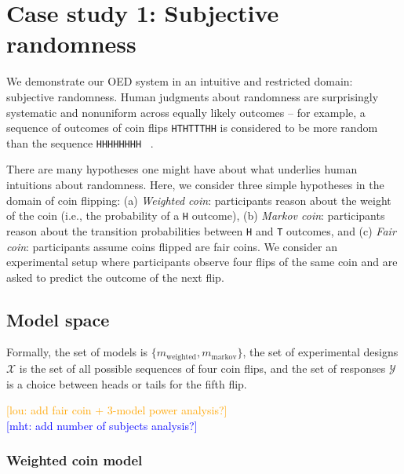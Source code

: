 \documentclass{article}
\newcommand{\mht}[1]{\textcolor{Blue}{[mht: #1]}}
\newcommand{\lou}[1]{\textcolor{orange}{[lou: #1]}}
\begin{document}
\section{Case study 1: Subjective randomness}
\label{s:tutorial}

We demonstrate our OED system in an intuitive and restricted domain: subjective randomness.
Human judgments about randomness are surprisingly systematic and nonuniform across equally likely outcomes -- for example, a sequence of outcomes of coin flips \lstinline{HTHTTTHH} is considered to be more random than the sequence \lstinline{HHHHHHHH} ~\cite{goodfellow38:jep, griffiths01:cogsci}.

There are many hypotheses one might have about what underlies human intuitions about randomness.
Here, we consider three simple hypotheses in the domain of coin flipping: (a) \emph{Weighted coin}: participants reason about the weight of the coin (i.e., the probability of a \lstinline{H} outcome), (b) \emph{Markov coin}: participants reason about the transition probabilities between \lstinline{H} and \lstinline{T} outcomes, and (c) \emph{Fair coin}: participants assume coins flipped are fair coins.
We consider an experimental setup where participants observe four flips of the same coin and are asked to predict the outcome of the next flip.


\subsection{Model space}


Formally, the set of models is $\{m_{\text{weighted}}, m_{\text{markov}}\}$, the set of experimental designs $\mathcal{X}$ is the set of all possible sequences of four coin flips, and the set of responses $\mathcal{Y}$ is a choice between heads or tails for the fifth flip.

\lou{add fair coin + 3-model power analysis?}\\
\mht{add number of subjects analysis?}

\subsubsection{Weighted coin model}
\label{s:tutorial:sss:biased}
\end{document}
